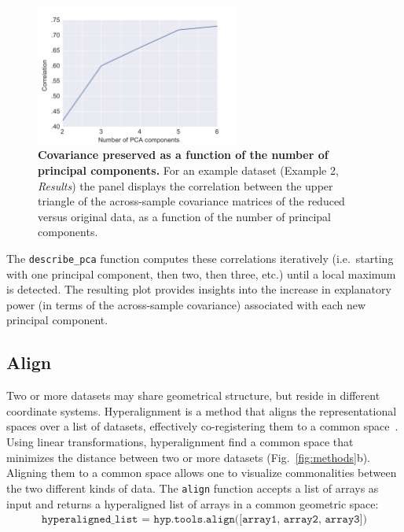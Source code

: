\documentclass[12pt,letterpaper]{article}
\newcounter{example}
\begin{document}
\begin{figure}[tbp]
\centering
\includegraphics[width=0.6\textwidth]{describe}
\caption{\textbf{Covariance preserved as a function of the number of principal components.}  For an example dataset (Example 2, \textit{Results}) the panel displays the correlation between the upper triangle of the across-sample covariance matrices of the reduced versus original data, as a function of the number of principal components.}
\label{fig:describe}
\end{figure}

The \texttt{describe\_pca} function computes these correlations iteratively (i.e.\ starting with one principal component, then two, then three, etc.) until a local maximum is detected.  The resulting plot provides insights into the increase in explanatory power (in terms of the across-sample covariance) associated with each new principal component.




\subsection*{Align}
Two or more datasets may share geometrical structure, but reside in different coordinate systems. Hyperalignment is a method that aligns the representational spaces over a list of datasets, effectively co-registering them to a common space~\cite{HaxbEtal11}.  Using linear transformations, hyperalignment find a common space that minimizes the distance between two or more datasets (Fig.~\ref{fig:methods}b).  Aligning them to a common space allows one to visualize commonalities between the two different kinds of data.  The \texttt{align} function accepts a list of arrays as input and returns a hyperaligned list of arrays in a common geometric space:
\begin{align}
\texttt{hyperaligned\_list = hyp.tools.align([array1, array2, array3])}
\end{align}
\end{document}
